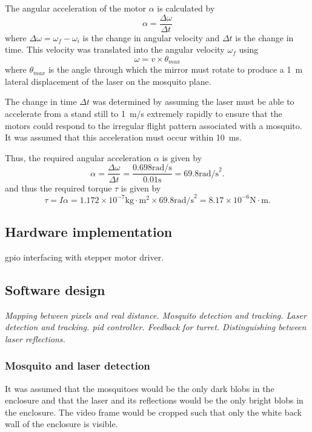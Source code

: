 The angular acceleration of the motor $\alpha$ is calculated by
\begin{equation}
    \alpha = \frac{\Delta\omega}{\Delta t}
    \label{eq:angular_acceleration}
\end{equation}
where $\Delta\omega = \omega_f - \omega_i$ is the change in angular velocity and $\Delta t$ is the change in time.  This velocity was translated into the angular velocity $\omega_f$ using
\begin{equation}
    \omega = v \times \theta_{max}
    \label{eq:angular_velocity}
\end{equation}
where $\theta_{max}$ is the angle through which the mirror must rotate to produce a 1~m lateral displacement of the laser on the mosquito plane.

The change in time $\Delta t$ was determined by assuming the laser must be able to accelerate from a stand still to 1~m/s extremely rapidly to ensure that the motors could respond to the irregular flight pattern associated with a mosquito. It was assumed that this acceleration must occur within 10~ms.

Thus, the required angular acceleration $\alpha$ is given by
\begin{equation}
    \alpha = \frac{\Delta\omega}{\Delta t} = \frac{0.698 \text{rad/s}}{0.01 \text{s}} = 69.8 \text{rad/s}^2.
    \label{eq:angular_acceleration_calculation}
\end{equation}
and thus the required torque $\tau$ is given by
\begin{equation}
    \tau = I\alpha = 1.172 \times 10^{-7} \text{kg} \cdot \text{m}^2 \times 69.8 \text{rad/s}^2 = 8.17 \times 10^{-6} \text{N} \cdot \text{m}.
    \label{eq:torque_calculation}
\end{equation}


\subsection{Hardware implementation}
\gls{gpio} interfacing with stepper motor driver.


\subsection{Software design}
\textit{Mapping between pixels and real distance. Mosquito detection and tracking. Laser detection and tracking. \gls{pid} controller. Feedback for turret. Distinguishing between laser reflections.}

\subsubsection{Mosquito and laser detection}
It was assumed that the mosquitoes would be the only dark blobs in the enclosure and that the laser and its reflections would be the only bright blobs in the enclosure. The video frame would be cropped such that only the white back wall of the enclosure is visible.

